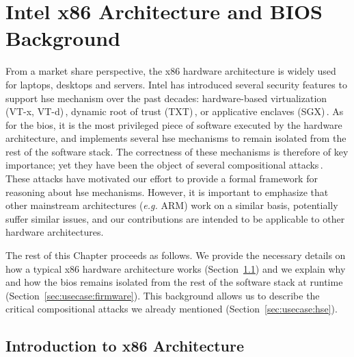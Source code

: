 \chapter{Intel x86 Architecture and BIOS Background}
\label{chapter:usecase}


\vspace{1cm}%
\noindent
%
From a market share perspective, the x86 hardware architecture is widely used
for laptops, desktops and servers.
%
Intel has introduced several security features to support \ac{hse} mechanism
over the past decades: hardware-based virtualization (VT-x, VT-d)\,\cite[Volume
  3, Chapter 23]{intel2014manual}, dynamic root of trust
(TXT)\,\cite{intel2015txt}, or applicative enclaves (SGX)\,\cite[Volume 3,
  Chapter 36]{intel2014manual}\cite{costan2016sgxexplained}.
%
As for the \ac{bios}, it is the most privileged piece of software executed by
the hardware architecture, and implements several \ac{hse} mechanisms to remain
isolated from the rest of the software stack.
%
The correctness of these mechanisms is therefore of key importance; yet they
have been the object of several compositional
attacks\,\cite{duflot2009smram,wojtczuk2009smram,domas2015sinkhole,kallenberg2015racecondition,kovah2015senter}.
%
These attacks have motivated our effort to provide a formal framework for
reasoning about \ac{hse} mechanisms.
%
However, it is important to emphasize that other mainstream architectures
(\emph{e.g.}  ARM) work on a similar basis, potentially suffer similar issues,
and our contributions are intended to be applicable to other hardware
architectures.

The rest of this Chapter proceeds as follows.
%
We provide the necessary details on how a typical x86 hardware architecture
works (Section~\ref{sec:usecase:architecture}) and we explain why and how the
\ac{bios} remains isolated from the rest of the software stack at runtime
(Section~\ref{sec:usecase:firmware}).
%
This background allows us to describe the critical compositional attacks we
already mentioned (Section~\ref{sec:usecase:hse}).

\section{Introduction to x86 Architecture}
\label{sec:usecase:architecture}

